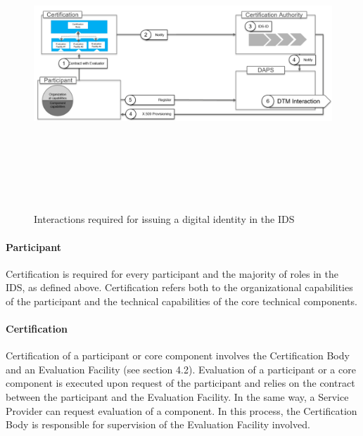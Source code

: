 
\begin{figure}[H]
	\begin{Center}
		\includegraphics[width=6.53in,height=4.32in]{./media/DigitalIdentities.png}
		\caption{ Interactions required for issuing a digital identity in the IDS}
		\label{fig:_Interactions_required_for_issuing_a_digital_identity_in_the_IDS}
	\end{Center}
\end{figure}










\paragraph{Participant}
Certification is required for every participant and the majority of roles in the IDS, as defined above. Certification refers both to the organizational capabilities of the participant and the technical capabilities of the core technical components.


\paragraph{Certification} %
Certification of a participant or core component involves the Certification Body and an Evaluation Facility (see section 4.2). Evaluation of a participant or a core component is executed upon request of the participant and relies on the contract between the participant and the Evaluation Facility. In the same way, a Service Provider can request evaluation of a component. In this process, the Certification Body is responsible for supervision of the Evaluation Facility involved.


